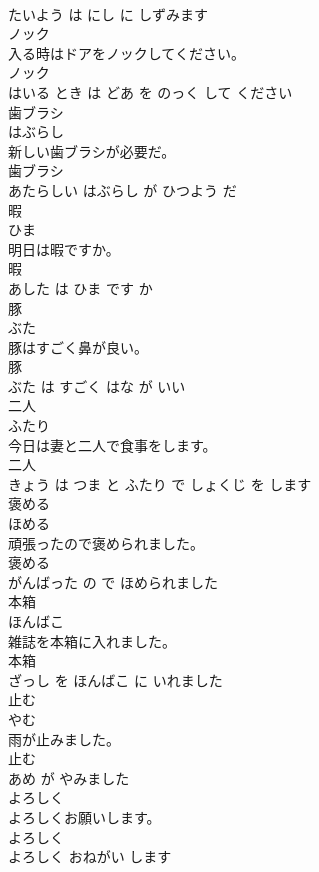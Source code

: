 \documentclass[8pt]{extreport}
\begin{document}
\begin{CJK}{UTF8}{min}
\\	たいよう は にし に しずみます			
\\	ノック	
\\	入る時はドアをノックしてください。	
\\	ノック 
\\	はいる とき は どあ を のっく して ください			
\\	歯ブラシ	
\\	はぶらし			
\\	新しい歯ブラシが必要だ。	
\\	歯ブラシ 
\\	あたらしい はぶらし が ひつよう だ			
\\	暇	
\\	ひま			
\\	明日は暇ですか。	
\\	暇 
\\	あした は ひま です か			
\\	豚	
\\	ぶた			
\\	豚はすごく鼻が良い。	
\\	豚 
\\	ぶた は すごく はな が いい			
\\	二人	
\\	ふたり			
\\	今日は妻と二人で食事をします。	
\\	二人 
\\	きょう は つま と ふたり で しょくじ を します			
\\	褒める	
\\	ほめる			
\\	頑張ったので褒められました。	
\\	褒める 
\\	がんばった の で ほめられました			
\\	本箱	
\\	ほんばこ			
\\	雑誌を本箱に入れました。	
\\	本箱 
\\	ざっし を ほんばこ に いれました			
\\	止む	
\\	やむ			
\\	雨が止みました。	
\\	止む 
\\	あめ が やみました			
\\	よろしく	
\\	よろしくお願いします。	
\\	よろしく 
\\	よろしく おねがい します			

\end{CJK}
\end{document}
